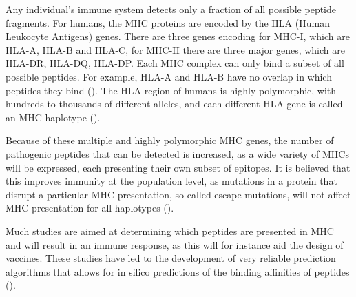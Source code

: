 
Any individual's immune system detects only a fraction of all possible
peptide fragments.
For humans, the MHC proteins are encoded by the
HLA (Human Leukocyte Antigens) genes.
There are three genes encoding for MHC-I, which are HLA-A, HLA-B and HLA-C,
for MHC-II there are three major genes, which are HLA-DR, HLA-DQ, HLA-DP.
Each MHC complex can only bind a subset of all possible peptides.
For example, HLA-A and HLA-B have no overlap in which
peptides they bind (\cite{lund2004definition}).
The HLA region of humans is highly polymorphic, with hundreds 
to thousands of different alleles, 
and each different HLA gene is called 
an MHC haplotype (\cite{marsh2010nomenclature}).


Because of these multiple and highly polymorphic MHC genes,
the number of pathogenic peptides that can be detected is increased,
as a wide variety of MHCs will be expressed,
each presenting their own subset of epitopes.
It is believed that this improves immunity at the population level, 
as mutations in a protein that disrupt a particular MHC presentation, 
so-called escape mutations, 
will not affect MHC presentation for all haplotypes (\cite{sommer2005importance}).


Much studies are aimed at determining which peptides are presented in MHC 
and will result in an immune response, 
as this will for instance aid the design of vaccines. 
These studies have led to the development 
of very reliable prediction algorithms 
that allows for in silico predictions 
of the binding affinities of peptides (\cite{larsen2010identification,schellens2008unanticipated,tang2011genome}).
 


